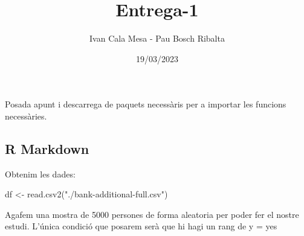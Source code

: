 \documentclass[
]{article}
\title{Entrega-1}
\author{Ivan Cala Mesa - Pau Bosch Ribalta}
\date{19/03/2023}
\newenvironment{Shaded}{\begin{snugshade}}{\end{snugshade}}
\newcommand{\AttributeTok}[1]{\textcolor[rgb]{0.77,0.63,0.00}{#1}}
\newcommand{\DecValTok}[1]{\textcolor[rgb]{0.00,0.00,0.81}{#1}}
\newcommand{\FunctionTok}[1]{\textcolor[rgb]{0.00,0.00,0.00}{#1}}
\newcommand{\NormalTok}[1]{#1}
\newcommand{\OtherTok}[1]{\textcolor[rgb]{0.56,0.35,0.01}{#1}}
\newcommand{\SpecialCharTok}[1]{\textcolor[rgb]{0.00,0.00,0.00}{#1}}
\newcommand{\StringTok}[1]{\textcolor[rgb]{0.31,0.60,0.02}{#1}}
\begin{document}
\maketitle

{
\setcounter{tocdepth}{3}
\tableofcontents
}
Posada apunt i descarrega de paquets necessàris per a importar les
funcions necessàries.

\hypertarget{r-markdown}{%
\subsection{R Markdown}\label{r-markdown}}

Obtenim les dades:

\begin{Shaded}
\begin{Highlighting}[]
\NormalTok{df }\OtherTok{\textless{}{-}} \FunctionTok{read.csv2}\NormalTok{(}\StringTok{"./bank{-}additional{-}full.csv"}\NormalTok{)}
\end{Highlighting}
\end{Shaded}

Agafem una mostra de 5000 persones de forma aleatoria per poder fer el
nostre estudi. L'única condició que posarem serà que hi hagi un rang de
y = yes

\begin{Shaded}
\end{Shaded}
\end{document}
